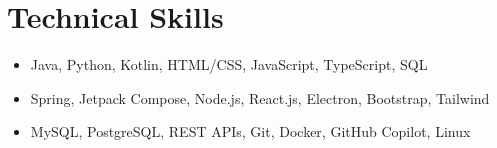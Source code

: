 \section{Technical Skills}
\begin{itemize}[leftmargin=0.15in, label={}, itemsep=0pt, parsep=1pt]
    \small
    \item {}Java, Python, Kotlin, HTML/CSS, JavaScript, TypeScript, SQL
    \item {}Spring, Jetpack Compose, Node.js, React.js, Electron, Bootstrap, Tailwind
    \item {}MySQL, PostgreSQL, REST APIs, Git, Docker, GitHub Copilot, Linux
\end{itemize}
